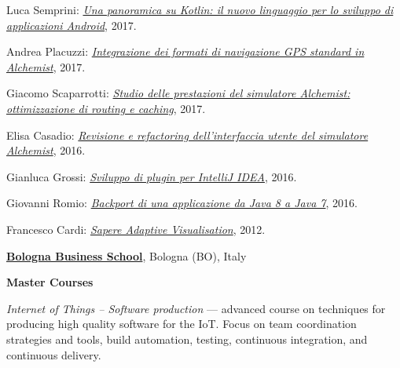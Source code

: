 \begin{outerlist}
\begin{innerlist}
      \item Luca Semprini: \href{http://amslaurea.unibo.it/14673/}{\textit{Una panoramica su Kotlin: il nuovo linguaggio per lo sviluppo di applicazioni Android}}, 2017.
      \item Andrea Placuzzi: \href{http://amslaurea.unibo.it/14329/}{\textit{Integrazione dei formati di navigazione GPS standard in Alchemist}}, 2017.
      \item Giacomo Scaparrotti: \href{http://amslaurea.unibo.it/14019/}{\textit{Studio delle prestazioni del simulatore Alchemist: ottimizzazione di routing e caching}}, 2017.
      \item Elisa Casadio: \href{http://amslaurea.unibo.it/12310/}{\textit{Revisione e refactoring dell'interfaccia utente del simulatore Alchemist}}, 2016.
      \item Gianluca Grossi: \href{http://amslaurea.unibo.it/12503/}{\textit{Sviluppo di plugin per IntelliJ IDEA}}, 2016.
      \item Giovanni Romio: \href{http://amslaurea.unibo.it/10481/}{\textit{Backport di una applicazione da Java 8 a Java 7}}, 2016.
      \item Francesco Cardi: \href{http://archive.fo/zMGo8}{\textit{Sapere Adaptive Visualisation}}, 2012.
    \end{innerlist}
\end{outerlist}
\halfblankline

\href{https://www.bbs.unibo.eu/hp/}{\textbf{Bologna Business School}}, Bologna (BO), Italy
\begin{outerlist}
\item[] \textbf{Master Courses} %
    \begin{innerlist}
        \item \textit{Internet of Things -- Software production} --- advanced course on techniques for producing high quality software for the IoT. Focus on team coordination strategies and tools, build automation, testing, continuous integration, and continuous delivery.
\end{innerlist}
\halfblankline
\end{outerlist}


